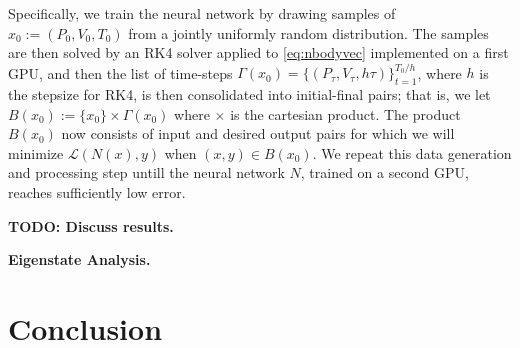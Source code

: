 \documentclass{article}
\numberwithin{theorem}{section}
\numberwithin{equation}{section}
\def\scriptl{{\mathcal L}}
\begin{document}
 Specifically, we train the neural network by drawing samples of $x_0 := (P_0, V_0, T_0)$ from a jointly uniformly random distribution. The samples are then solved by an RK4 solver applied to \eqref{eq:nbodyvec} implemented on a first GPU, and then the list of time-steps $\Gamma(x_0) = \{(P_\tau, V_\tau, h\tau)\}_{t=1}^{T_0/h}$, where $h$ is the stepsize for RK4, is then consolidated into initial-final pairs; that is, we let $B(x_0) := \{x_0\} \times \Gamma(x_0)$ where $\times$ is the cartesian product. The product $B(x_0)$ now consists of input and desired output pairs for which we will minimize $\scriptl(N(x), y)$ when $(x,y) \in B(x_0)$. We repeat this data generation and processing step untill the neural network $N$, trained on a second GPU, reaches sufficiently low error.

 \textbf{TODO: Discuss results.}


 \textbf{Eigenstate Analysis. }

\section{Conclusion}


% 
% 
% 
% 
% 
% 

% 
% 
% 
\end{document}

